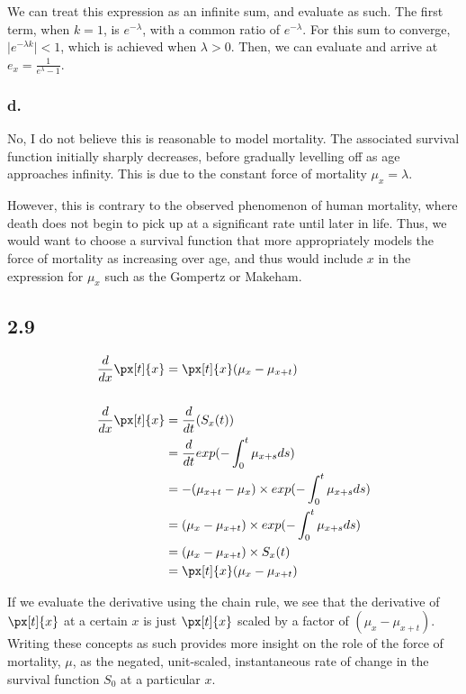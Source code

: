 \documentclass[
]{article}
\begin{document}
We can treat this expression as an infinite sum, and evaluate as such.
The first term, when \(k = 1\), is \(e^{-\lambda}\), with a common ratio
of \(e^{-\lambda}\). For this sum to converge,
\(\mid e^{-\lambda k}\mid < 1\), which is achieved when \(\lambda > 0\).
Then, we can evaluate and arrive at
\(e_{x} = \frac{1}{e^{\lambda}- 1}\).

\hypertarget{d.}{%
\subsubsection{d.}\label{d.}}

No, I do not believe this is reasonable to model mortality. The
associated survival function initially sharply decreases, before
gradually levelling off as age approaches infinity. This is due to the
constant force of mortality \(\mu_{x} = \lambda\).

However, this is contrary to the observed phenomenon of human mortality,
where death does not begin to pick up at a significant rate until later
in life. Thus, we would want to choose a survival function that more
appropriately models the force of mortality as increasing over age, and
thus would include \(x\) in the expression for \(\mu_{x}\) such as the
Gompertz or Makeham.

\hypertarget{section-2}{%
\subsection{2.9}\label{section-2}}

\[
\begin{aligned}
\frac{d}{dx} \px[t]{x} &= \px[t]{x} (\mu_{x} - \mu_{x + t}) \\ \\
\frac{d}{dx} \px[t]{x} &=  \frac{d}{dt}(S_{x}(t)) \\
&= \frac{d}{dt}exp(- \int_{0}^{t} \mu_{x + s}ds) \\
&= -(\mu_{x + t} - \mu_{x}) \times exp(- \int_{0}^{t} \mu_{x + s}ds) \\
&= (\mu_{x} - \mu_{x + t} ) \times exp(- \int_{0}^{t} \mu_{x + s}ds) \\
&= (\mu_{x} - \mu_{x + t} ) \times S_{x}(t) \\
&= \px[t]{x} (\mu_{x} - \mu_{x + t} )
\end{aligned}
\]

If we evaluate the derivative using the chain rule, we see that the
derivative of \(\px[t]{x}\) at a certain \(x\) is just \(\px[t]{x}\)
scaled by a factor of \((\mu_{x} - \mu_{x + t} )\). Writing these
concepts as such provides more insight on the role of the force of
mortality, \(\mu\), as the negated, unit-scaled, instantaneous rate of
change in the survival function \(S_{0}\) at a particular \(x\).
\end{document}
